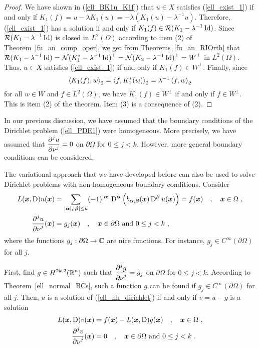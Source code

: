 \begin{proof}
We have shown in (\ref{ell_BK1u_K1f}) that $u\in X$ satisfies
(\ref{ell_exist_1}) if and
only if $\displaystyle K_1(f) = u - \lambda K_1(u)
= -\lambda ( K_1(u) - \lambda^{-1} u)$.
Therefore, (\ref{ell_exist_1}) has a solution if and only if
$\displaystyle K_1(f) \in \mathcal{R}(K_1 - \lambda^{-1}\operatorname{Id})$.  Since
$\displaystyle \mathcal{R}(K_1 -\lambda^{-1}\operatorname{Id})$ is closed in
$\displaystyle L^2(\Omega)$ according to
item (2) of Theorem~\ref{fu_an_comp_oper}, we get
from Theorems~\ref{fu_an_RIOrth} that
$\displaystyle \mathcal{R}(K_1-\lambda^{-1}\operatorname{Id}) = \mathcal{N}(K_1^\ast-\lambda^{-1}\operatorname{Id})^\perp
= \mathcal{N}(K_2-\lambda^{-1}\operatorname{Id})^\perp = W^\perp$ in
$\displaystyle L^2(\Omega)$.  Thus, $u\in X$ satisfies
(\ref{ell_exist_1}) if and only if $K_1(f) \in W^\perp$.  Finally,
since
\[
\left\langle{K_1(f)} , {w}\right\rangle_2 = \left\langle{f} , {K_1^\ast(w)}\right\rangle_2 = \lambda^{-1} \left\langle{f} , {w}\right\rangle_2
\]
for all $w \in W$ and $\displaystyle f \in L^2(\Omega)$,
we have $\displaystyle K_1(f) \in W^\perp$ if and only if
$\displaystyle f\in W^\perp$.  This is
item (2) of the theorem.  Item (3) is a consequence of (2).
\end{proof}

\begin{rmk}
In our previous discussion, we have assumed that the boundary
conditions of the Dirichlet problem (\ref{ell_PDE1}) were homogeneous.
More precisely, we have assumed that
$\displaystyle \frac{\displaystyle \partial^{j}{u}} {\displaystyle \partial \nu^{j}} = 0$ on
$\partial \Omega$ for $0 \leq j < k$.  However, more
general boundary conditions can be considered.   \label{ellRmkNhom}

The variational approach that we have developed before can also be
used to solve Dirichlet problems with non-homogeneous boundary
conditions.  Consider
\begin{equation} \label{ell_nh_dirichlet}
\begin{split}
L({\bm{x}}, \operatorname{D})u({\bm{x}})
&= \sum_{|{\bm{\alpha}}|,|{\bm{\beta}}|\leq k} (-1)^{|{\bm{\alpha}}|}
\operatorname{D}^{{\bm{\alpha}}} \left( b_{{\bm{\alpha}},{\bm{\beta}}}({\bm{x}})
\operatorname{D}^{{\bm{\beta}}} u({\bm{x}})\right) = f({\bm{x}}) \quad
, \quad {\bm{x}} \in \Omega \ ,\\
\frac{\displaystyle \partial^{j}{u}} {\displaystyle \partial \nu^{j}}({\bm{x}}) &= g_j({\bm{x}}) \quad , \quad
{\bm{x}} \in \partial \Omega \ \text{and}\ 0 \leq j < k \ ,
\end{split}
\end{equation}
where the functions $g_j:\partial \Omega \rightarrow \mathbb{C}$ are nice
functions.  For instance, $g_j \in C^\infty(\partial \Omega)$ for all $j$.

First, find $\displaystyle g\in H^{2k,2}(\mathbb{R}^n)$ such that
$\displaystyle \frac{\displaystyle \partial^{j}{g}} {\displaystyle \partial \nu^{j}} = g_j$ on $\partial \Omega$ for
$0 \leq j < k$.  According to Theorem~\ref{ell_normal_BCs}, such a
function $g$ can be found if
$\displaystyle g_j \in C^\infty(\partial \Omega)$ for
all $j$.  Then, $u$ is a solution of (\ref{ell_nh_dirichlet}) if and
only if $v=u-g$ is a solution
\begin{align*}
L({\bm{x}}, \operatorname{D})v({\bm{x}}) &= f({\bm{x}}) - L({\bm{x}},\operatorname{D}) g({\bm{x}}) \quad
, \quad {\bm{x}} \in \Omega \ ,\\
\frac{\displaystyle \partial^{j}{v}} {\displaystyle \partial \nu^{j}}({\bm{x}}) &= 0 \quad , \quad
{\bm{x}} \in \partial \Omega \ \text{and}\ 0 \leq j < k\ .
\end{align*}
\end{rmk}

